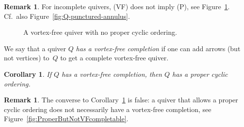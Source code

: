 \documentclass[11pt, letterpaper]{amsart}
\newtheorem{corollary}[theorem]{Corollary}
\theoremstyle{definition}
\newtheorem{remark}[theorem]{Remark}
\numberwithin{equation}{section}
\begin{document}
\fi

\pagebreak[3]

\begin{remark}
For incomplete quivers, (VF) does not imply (P), see Figure~\ref{fig:VF but not proper}. %
Cf.\ also Figure~\ref{fig:Q-punctured-annulus}. 
\end{remark}

\begin{figure}[ht]
\begin{center}
\end{center}
\vspace{5pt}
\caption{A vortex-free quiver with no proper cyclic ordering.}
\vspace{-5pt}
\label{fig:VF but not proper}
\end{figure}

We say that a quiver $Q$ \emph{has a vortex-free completion} if one can add arrows (but not vertices) 
to~$Q$ to get a complete vortex-free quiver. 

\begin{corollary}
\label{cor:VF-completion}
 If $Q$ has a vortex-free completion, then $Q$ has a proper cyclic ordering. 
\end{corollary}

\begin{remark}
The converse to Corollary~\ref{cor:VF-completion} is false:
a quiver that allows a proper cyclic ordering does not necessarily have a vortex-free completion, see Figure~\ref{fig:ProperButNotVFcompletable}.
\end{remark}

\enlargethispage{5pt}
\end{document}
